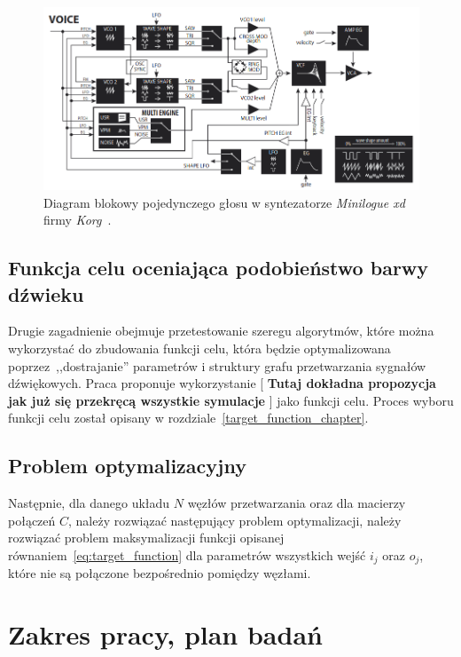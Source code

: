 \begin{figure}[H]
    \centering
    \includegraphics[width=0.8\linewidth]{rys01/minilogue_voice_block_diagram.png}
    \caption{
      Diagram blokowy pojedynczego głosu w syntezatorze 
      \textit{Minilogue xd} firmy \textit{Korg}~\cite{minilogue_diagram}.
    }\label{fig:minilogue_diagram}
\end{figure}

\subsection{Funkcja celu oceniająca podobieństwo barwy dźwieku}

Drugie zagadnienie obejmuje przetestowanie szeregu algorytmów, które można
wykorzystać do zbudowania funkcji celu, która będzie optymalizowana
poprzez~,,dostrajanie'' parametrów i struktury grafu przetwarzania sygnałów dźwiękowych.
Praca proponuje wykorzystanie [
  \textbf{Tutaj dokładna propozycja jak już się przekręcą wszystkie symulacje}
] jako funkcji celu. Proces wyboru funkcji celu został
opisany w rozdziale~\ref{target_function_chapter}.

\subsection{Problem optymalizacyjny}

Następnie, dla danego układu $N$ węzłów przetwarzania oraz dla macierzy połączeń $C$, 
należy rozwiązać następujący problem optymalizacji, należy rozwiązać problem
maksymalizacji funkcji opisanej równaniem~\ref{eq:target_function} dla
parametrów wszystkich wejść $i_j$ oraz $o_j$, które nie są połączone bezpośrednio
pomiędzy węzłami.




\section{Zakres pracy, plan badań}\label{chap:thesis_scope}

